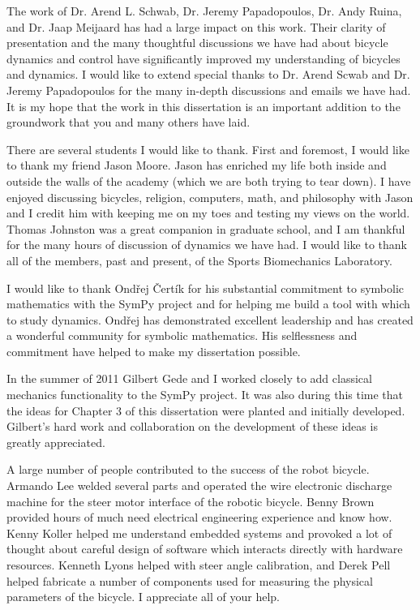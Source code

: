 The work of Dr. Arend L. Schwab, Dr. Jeremy Papadopoulos, Dr. Andy Ruina, and
Dr. Jaap Meijaard has had a large impact on this work. Their clarity of
presentation and the many thoughtful discussions we have had about bicycle
dynamics and control have significantly improved my understanding of bicycles
and dynamics. I would like to extend special thanks to Dr. Arend Scwab and Dr.
Jeremy Papadopoulos for the many in-depth discussions and emails we have had.
It is my hope that the work in this dissertation is an important addition to
the groundwork that you and many others have laid.

There are several students I would like to thank. First and foremost, I would
like to thank my friend Jason Moore. Jason has enriched my life both inside and
outside the walls of the academy (which we are both trying to tear down). I
have enjoyed discussing bicycles, religion, computers, math, and philosophy
with Jason and I credit him with keeping me on my toes and testing my views on
the world. Thomas Johnston was a great companion in graduate school, and I am
thankful for the many hours of discussion of dynamics we have had. I would like
to thank all of the members, past and present, of the Sports Biomechanics
Laboratory.

I would like to thank Ond\v{r}ej \v{C}ert\'{i}k for his substantial commitment
to symbolic mathematics with the SymPy project and for helping me build a tool
with which to study dynamics. Ond\v{r}ej has demonstrated excellent leadership
and has created a wonderful community for symbolic mathematics.  His
selflessness and commitment have helped to make my dissertation possible.

In the summer of 2011 Gilbert Gede and I worked closely to add classical
mechanics functionality to the SymPy project. It was also during this time that
the ideas for Chapter 3 of this dissertation were planted and initially
developed. Gilbert's hard work and collaboration on the development of these
ideas is greatly appreciated.

A large number of people contributed to the success of the robot bicycle.
Armando Lee welded several parts and operated the wire electronic discharge
machine for the steer motor interface of the robotic bicycle. Benny Brown
provided hours of much need electrical engineering experience and know how.
Kenny Koller helped me understand embedded systems and provoked a lot of
thought about careful design of software which interacts directly with hardware
resources. Kenneth Lyons helped with steer angle calibration, and Derek Pell
helped fabricate a number of components used for measuring the physical
parameters of the bicycle. I appreciate all of your help.

